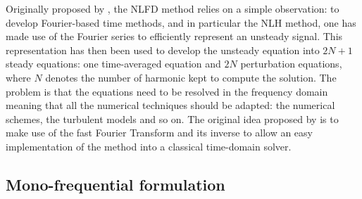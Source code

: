 
Originally proposed by \citet{McMullen2001}, the NLFD
method relies on a simple observation: 
to develop Fourier-based time methods, and in
particular the NLH method, one has made use of the Fourier
series to efficiently represent an unsteady signal.
This representation has then been used to develop the unsteady
equation into $2N+1$ steady equations: one time-averaged equation
and $2N$ perturbation equations, 
where $N$ denotes the number
of harmonic kept to compute the solution.
The problem is that the equations need to be 
resolved in the frequency domain meaning
that all the numerical techniques should be adapted: the numerical schemes,
the turbulent models and so on. The original idea 
proposed by \citet{McMullen2001} is to
make use of the fast Fourier Transform and its inverse to
allow an easy implementation of the method into a classical time-domain solver.

\subsection{Mono-frequential formulation}

